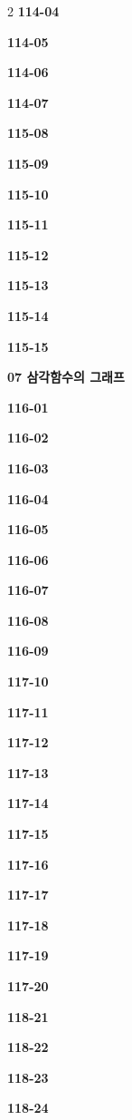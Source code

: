 \documentclass[10pt,a4paper]{article}
\begin{document}
\begin{multicols}{2}
\noindent\textbf{114-04}\ \par
\noindent\textbf{114-05}\ \par
\noindent\textbf{114-06}\ \par
\noindent\textbf{114-07}\ \par
\noindent\textbf{115-08}\ \par
\noindent\textbf{115-09}\ \par
\noindent\textbf{115-10}\ \par
\noindent\textbf{115-11}\ \par
\noindent\textbf{115-12}\ \par
\noindent\textbf{115-13}\ \par
\noindent\textbf{115-14}\ \par
\noindent\textbf{115-15}\ \par
\noindent\textbf{07 삼각함수의 그래프}\par\smallskip
\noindent\textbf{116-01}\ \par
\noindent\textbf{116-02}\ \par
\noindent\textbf{116-03}\ \par
\noindent\textbf{116-04}\ \par
\noindent\textbf{116-05}\ \par
\noindent\textbf{116-06}\ \par
\noindent\textbf{116-07}\ \par
\noindent\textbf{116-08}\ \par
\noindent\textbf{116-09}\ \par
\noindent\textbf{117-10}\ \par
\noindent\textbf{117-11}\ \par
\noindent\textbf{117-12}\ \par
\noindent\textbf{117-13}\ \par
\noindent\textbf{117-14}\ \par
\noindent\textbf{117-15}\ \par
\noindent\textbf{117-16}\ \par
\noindent\textbf{117-17}\ \par
\noindent\textbf{117-18}\ \par
\noindent\textbf{117-19}\ \par
\noindent\textbf{117-20}\ \par
\noindent\textbf{118-21}\ \par
\noindent\textbf{118-22}\ \par
\noindent\textbf{118-23}\ \par
\noindent\textbf{118-24}\ \par

\end{multicols}
\end{document}
